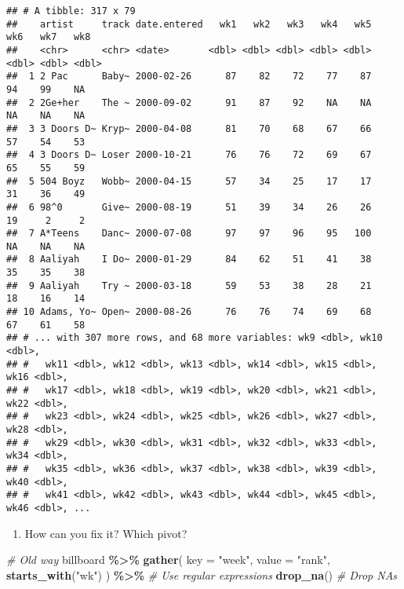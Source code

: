 \documentclass[
]{book}
\newenvironment{Shaded}{\begin{snugshade}}{\end{snugshade}}
\newcommand{\CommentTok}[1]{\textcolor[rgb]{0.56,0.35,0.01}{\textit{#1}}}
\newcommand{\DataTypeTok}[1]{\textcolor[rgb]{0.13,0.29,0.53}{#1}}
\newcommand{\KeywordTok}[1]{\textcolor[rgb]{0.13,0.29,0.53}{\textbf{#1}}}
\newcommand{\NormalTok}[1]{#1}
\newcommand{\OperatorTok}[1]{\textcolor[rgb]{0.81,0.36,0.00}{\textbf{#1}}}
\newcommand{\StringTok}[1]{\textcolor[rgb]{0.31,0.60,0.02}{#1}}
\providecommand{\tightlist}{%
  \setlength{\itemsep}{0pt}\setlength{\parskip}{0pt}}
\begin{document}
\begin{verbatim}
## # A tibble: 317 x 79
##    artist     track date.entered   wk1   wk2   wk3   wk4   wk5   wk6   wk7   wk8
##    <chr>      <chr> <date>       <dbl> <dbl> <dbl> <dbl> <dbl> <dbl> <dbl> <dbl>
##  1 2 Pac      Baby~ 2000-02-26      87    82    72    77    87    94    99    NA
##  2 2Ge+her    The ~ 2000-09-02      91    87    92    NA    NA    NA    NA    NA
##  3 3 Doors D~ Kryp~ 2000-04-08      81    70    68    67    66    57    54    53
##  4 3 Doors D~ Loser 2000-10-21      76    76    72    69    67    65    55    59
##  5 504 Boyz   Wobb~ 2000-04-15      57    34    25    17    17    31    36    49
##  6 98^0       Give~ 2000-08-19      51    39    34    26    26    19     2     2
##  7 A*Teens    Danc~ 2000-07-08      97    97    96    95   100    NA    NA    NA
##  8 Aaliyah    I Do~ 2000-01-29      84    62    51    41    38    35    35    38
##  9 Aaliyah    Try ~ 2000-03-18      59    53    38    28    21    18    16    14
## 10 Adams, Yo~ Open~ 2000-08-26      76    76    74    69    68    67    61    58
## # ... with 307 more rows, and 68 more variables: wk9 <dbl>, wk10 <dbl>,
## #   wk11 <dbl>, wk12 <dbl>, wk13 <dbl>, wk14 <dbl>, wk15 <dbl>, wk16 <dbl>,
## #   wk17 <dbl>, wk18 <dbl>, wk19 <dbl>, wk20 <dbl>, wk21 <dbl>, wk22 <dbl>,
## #   wk23 <dbl>, wk24 <dbl>, wk25 <dbl>, wk26 <dbl>, wk27 <dbl>, wk28 <dbl>,
## #   wk29 <dbl>, wk30 <dbl>, wk31 <dbl>, wk32 <dbl>, wk33 <dbl>, wk34 <dbl>,
## #   wk35 <dbl>, wk36 <dbl>, wk37 <dbl>, wk38 <dbl>, wk39 <dbl>, wk40 <dbl>,
## #   wk41 <dbl>, wk42 <dbl>, wk43 <dbl>, wk44 <dbl>, wk45 <dbl>, wk46 <dbl>, ...
\end{verbatim}

\begin{enumerate}
\def\labelenumi{\arabic{enumi}.}
\setcounter{enumi}{1}
\tightlist
\item
  How can you fix it? Which pivot?
\end{enumerate}

\begin{Shaded}
\begin{Highlighting}[]
\CommentTok{\# Old way}
\NormalTok{billboard }\OperatorTok{\%\textgreater{}\%}
\StringTok{  }\KeywordTok{gather}\NormalTok{(}
    \DataTypeTok{key =} \StringTok{"week"}\NormalTok{,}
    \DataTypeTok{value =} \StringTok{"rank"}\NormalTok{,}
    \KeywordTok{starts\_with}\NormalTok{(}\StringTok{"wk"}\NormalTok{)}
\NormalTok{  ) }\OperatorTok{\%\textgreater{}\%}\StringTok{ }\CommentTok{\# Use regular expressions}
\StringTok{  }\KeywordTok{drop\_na}\NormalTok{() }\CommentTok{\# Drop NAs}
\end{Highlighting}
\end{Shaded}
\end{document}
